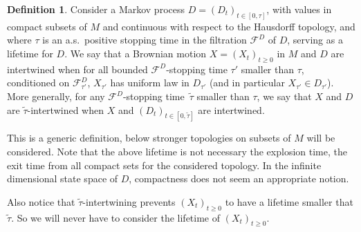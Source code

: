 \documentclass[10pt]{amsart}
\theoremstyle{plain}
\theoremstyle{definition}
\newtheorem{definition}[thm]{Definition}
\newcommand{\SF}{{\mathscr F}}
\let\wi\widetilde
\begin{document}
\begin{definition}
\label{D6.0}
Consider a Markov process $D=(D_t)_{t\in[0,\tau]}$, with values in compact subsets of $M$ and continuous with respect to the Hausdorff topology,
and where $\tau$ is an a.s.\ positive stopping time in the filtration $\SF^D$ of $D$, serving as a lifetime for $D$.
We say that a Brownian motion $X=(X_t)_{t\geq 0}$ in $M$ and $D$ are intertwined when for all bounded $\SF^D$-stopping time $\tau'$ smaller than $\tau$, {conditioned on} $\SF_{\tau'}^D$, $X_{\tau'}$ has uniform law in $D_{\tau'}$ (and in particular $X_{\tau'}\in {D}_{\tau'}$).
More generally, for any $\SF^D$-stopping time~$\wi\tau$ smaller than $\tau$,
we say that $X$ and $D$ are $\wi\tau$-intertwined when $X$ and $(D_t)_{t\in[0,\wi\tau]}$ are intertwined.
\end{definition}
This is a generic definition, below stronger topologies on subsets of $M$ will be considered. Note that the above lifetime is not necessary the explosion time, \ie the exit time from all compact sets for the considered topology. In the infinite dimensional state space of $D$, compactness does not seem an appropriate notion.

Also notice that $\wi\tau$-intertwining prevents $(X_t)_{t\geq 0}$ to have a lifetime smaller that $\wi\tau$. So we will never have to consider the lifetime of $(X_t)_{t\geq 0}$.
\end{document}
